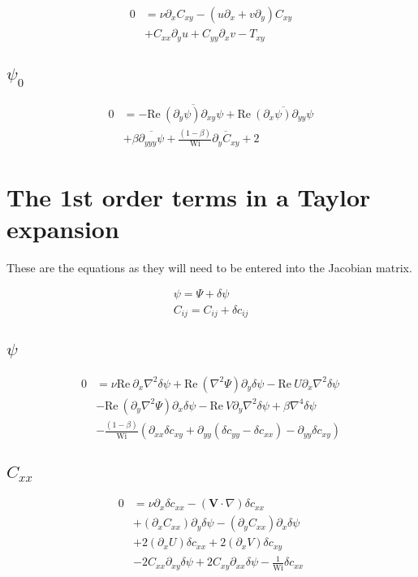 \documentclass[12,a4paper]{article}
\newcommand{\dd}[1]{\partial_{#1}}
\newcommand{\lpl}{\nabla^{2}}
\newcommand{\bih}{\nabla^{4}}
\newcommand{\scij}{\delta c_{ij}}
\newcommand{\scxx}{\delta c_{xx}}
\newcommand{\scyy}{\delta c_{yy}}
\newcommand{\scxy}{\delta c_{xy}}
\newcommand{\spsi}{\delta \psi}
\newcommand{\Wi}{\mathrm{Wi}}
\newcommand{\Rey}{\mathrm{Re \ }}
\begin{document}
\begin{align}
    0 &= \nu \dd{x} C_{xy} - (u\dd{x} + v\dd{y}) C_{xy} \nonumber\\
    &+ C_{xx} \dd{y}u + C_{yy}\dd{x}v - T_{xy}
\end{align}

\subsection{$\psi_{0}$}

\begin{align}
    0 &= - \Rey \overline{(\dd{y}\psi)\dd{xy}\psi} + \Rey \overline{(\dd{x}\psi)\dd{yy}\psi} \nonumber\\
    &+ \beta \overline{\dd{yyy}\psi} + \frac{(1-\beta)}{\Wi}\overline{\dd{y}C_{xy}} + 2
\end{align}

\section{The 1st order terms in a Taylor expansion}

These are the equations as they will need to be entered into the Jacobian matrix.

\begin{align}
\psi = \Psi + \spsi \\
C_{ij} = C_{ij} +\scij
\end{align}

\subsection{$\psi$}

\begin{align}
    0 &= \nu\Rey\dd{x}\lpl\spsi +  \Rey (\lpl\Psi) \dd{y}\spsi - \Rey U \dd{x}\lpl \spsi \nonumber\\
    &- \Rey (\dd{y}\lpl \Psi) \dd{x} \spsi - \Rey V \dd{y} \lpl \spsi + \beta \bih \spsi \nonumber\\
    &- \frac{(1-\beta)}{\Wi} \left( \dd{xx} \scxy +\dd{yy} (\scyy -\scxx) - \dd{yy} \scxy \right)
\end{align}

\subsection{$C_{xx}$}

\begin{align}
    0 &= \nu \dd{x} \scxx - (\mathbf{V}\cdot \nabla) \scxx \nonumber \\
    &+ (\dd{x}C_{xx})\dd{y}\spsi - (\dd{y}C_{xx})\dd{x} \spsi \nonumber\\
    &+ 2(\dd{x} U) \scxx + 2(\dd{x} V) \scxy \nonumber\\
    &- 2C_{xx}\dd{xy} \spsi + 2C_{xy}\dd{xx}\spsi - \frac{1}{\Wi}\scxx
\end{align}
\end{document}
